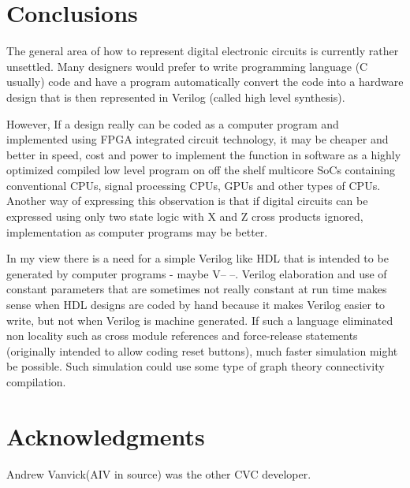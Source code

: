 \documentclass[preprint, authoryear]{sigplanconf}
\begin{document}
\section{Conclusions}
\par
The general area of how to represent digital electronic circuits is
currently rather unsettled.  Many designers would prefer to write
programming language (C usually) code and have a program automatically
convert the code into a hardware design that is then represented
in Verilog (called high level synthesis).
\par
However, If a design really can be coded as a computer
program and implemented
using FPGA integrated circuit technology, it may be cheaper
and better in speed, cost and power to implement the function
in software as a highly optimized compiled low level program
on off the shelf multicore SoCs containing
conventional CPUs, signal processing CPUs, GPUs and other types of CPUs.
Another way of expressing this observation is that if digital
circuits can be expressed using only two state logic with X and Z cross
products ignored, implementation as computer programs may be better. 
\par
In my view there is a need for a simple Verilog like HDL that
is intended to be generated by computer programs - maybe V-- --.
Verilog elaboration and use of constant parameters that are sometimes
not really constant at run time makes sense when HDL designs are
coded by hand because it makes Verilog easier to write,
but not when Verilog is machine generated.  If such
a language eliminated non locality such as cross module references
and force-release statements (originally intended to allow coding
reset buttons), much faster simulation might be possible.  Such
simulation could use some type of graph theory connectivity
compilation.
\section{Acknowledgments}
Andrew Vanvick(AIV in source) was the other CVC developer.


\end{document}
